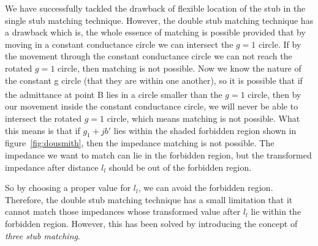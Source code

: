 We have successfully tackled the drawback of flexible location of the stub in the single stub matching technique. However, the double stub matching technique has a drawback which is, the whole essence of matching is possible provided that by moving in a constant conductance circle we can intersect the $g = 1$ circle. If by the movement through the constant conductance circle we can not reach the rotated $g = 1$ circle, then matching is not possible. Now we know the nature of the constant g circle (that they are within one another), so it is possible that if the admittance at point B\textsuperscript{\textemdash} lies in a circle smaller than the $g = 1$ circle, then by our movement inside the constant conductance circle, we will never be able to intersect the rotated $g = 1$ circle, which means matching is not possible. What this means is that if $g_1 + jb'$ lies within the shaded forbidden region shown in figure~\ref{fig:dousmith}, then the impedance matching is not possible. The impedance we want to match can lie in the forbidden region, but the transformed impedance after distance $ l_l$ should be out of the forbidden region.

So by choosing a proper value for $l_l$, we can avoid the forbidden region. Therefore, the double stub matching technique has a small limitation that it cannot match those impedances whose transformed value after $l_l$ lie within the forbidden region. However, this has been solved by introducing the concept of \emph{three stub matching}.

